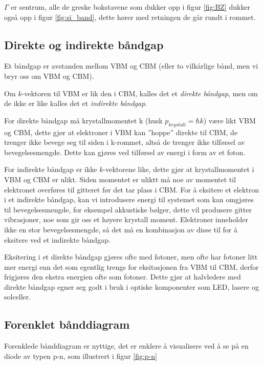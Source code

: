 $\Gamma$ er sentrum, alle de greske bokstavene som dukker opp i figur \ref{fig:BZ} dukker også opp i figur \ref{fig:si_band}, dette hører med retningen de går rundt i rommet. 

\subsection{Direkte og indirekte båndgap}
\label{sec:tema6_6}
Et båndgap er avstanden mellom VBM og CBM (eller to vilkårlige bånd, men vi bryr oss om VBM og CBM).

Om $k$-vektoren til VBM er lik den i CBM, kalles det et \textit{direkte båndgap}, men om de ikke er like kalles det et \textit{indirekte båndgap}.

For direkte båndgap må krystallmomentet k (husk $p_{krystall}=\hbar k$) være likt VBM og CBM, dette gjør at elektroner i VBM kan ''hoppe'' direkte til CBM, de trenger ikke bevege seg til siden i k-rommet, altså de trenger ikke tilførsel av bevegelsesmengde. Dette kan gjøres ved tilførsel av energi i form av et foton.

For indirekte båndgap er ikke $k$-vektorene like, dette gjør at krystallmomentet i VBM og CBM er ulikt. Siden momentet er uliktt må noe av momentet til elektronet overføres til gitteret før det tar plass i CBM. For å eksitere et elektron i et indirekte båndgap, kan vi introdusere energi til systemet som kan omgjøres til bevegelsesmengde, for eksempel akkustiske bølger, dette vil produsere gitter vibrasjoner, noe som gir oss et høyere krystall moment. Elektroner inneholder ikke en stor bevegelsesmengde, så det må en kombinasjon av disse til for å eksitere ved et indirekte båndgap. 

Eksitering i et direkte båndgap gjøres ofte med fotoner, men ofte har fotoner litt mer energi enn det som egentlig trengs for eksitasjonen fra VBM til CBM, derfor frigjøres den ekstra energien ofte som fotoner. Dette gjør at halvledere med direkte båndgap egner seg godt i bruk i optiske komponenter som LED, lasere og solceller. 

\subsection{Forenklet bånddiagram}
\label{sec:tema6_7}
Forenklede bånddiagram er nyttige, det er enklere å visualisere ved å se på en diode av typen p-n, som illustrert i figur \ref{fig:p-n}

